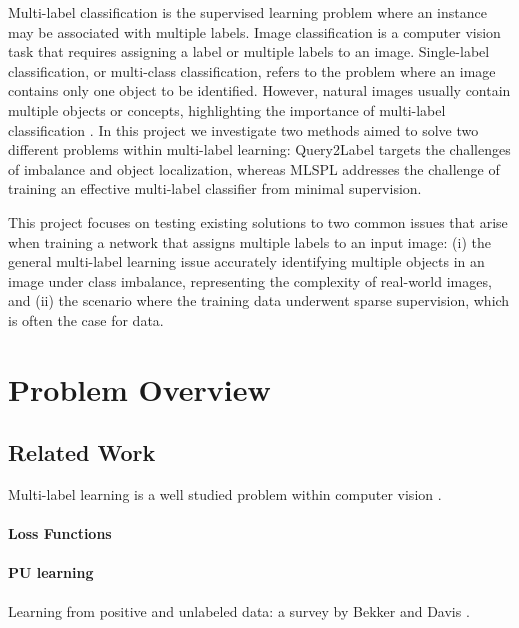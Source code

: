 \documentclass[lettersize,journal]{IEEEtran}
\begin{document}
Multi-label classification is the supervised learning problem where an instance may be associated with multiple labels. Image classification is a computer vision task that requires assigning a label or multiple labels to an image. Single-label classification, or multi-class classification, refers to the problem where an image contains only one object to be identified. However, natural images usually contain multiple objects or concepts, highlighting the importance of multi-label classification \cite{ridnik2021mldecoderscalableversatileclassification}. In this project we investigate two methods aimed to solve two different problems within multi-label learning: Query2Label targets the challenges of imbalance and object localization, whereas MLSPL addresses the challenge of training an effective multi-label classifier from minimal supervision.

This project focuses on testing existing solutions to two common issues that arise when training a network that assigns multiple labels to an input image: (i) the general multi-label learning issue accurately identifying multiple objects in an image under class imbalance, representing the complexity of real-world images, and (ii) the scenario where the training data underwent sparse supervision, which is often the case for data.

\section{Problem Overview}

\subsection{Related Work}
Multi-label learning is a well studied problem within computer vision \cite{mlsp}. 



\paragraph{Loss Functions}

\paragraph{PU learning} 
Learning from positive and unlabeled data: a survey by Bekker and Davis \cite{Bekker_2020}.
\end{document}
